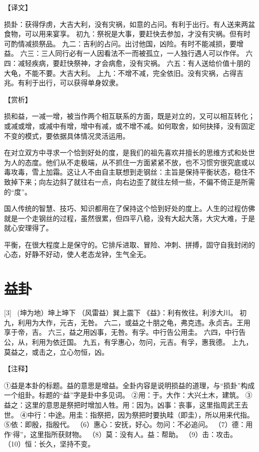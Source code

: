 \documentclass[12pt,UTF8]{ctexbook}
\begin{document}
【译文】

损卦：获得俘虏，大吉大利，没有灾祸，如意的占问。有利于出行。有人送来两盆食物，可以用来宴享。
初九：祭祝是大事，要赶快去参加，才没有灾祸。但有时可酌情减损祭品。
九二：吉利的占问。出讨他国，凶险。有时不能减损，要增益。
六三：三人同行必有一人因看法不一而被孤立，一人独行遇人可以作伴。
六四：减轻疾病，要赶快祭神，才会病愈，没有灾祸。
六五：有人送给价值十朋的大龟，不能不要。大吉大利。
上九：不增不减，完全依旧。没有灾祸，占得吉兆。有利于出行，可以获得单身奴隶。

【赏析】

损和益，一减一增，被当作两个相互联系的方面，既是对立的，又可以相互转化；或减或增，或减中有增，增中有减，或不增不减。如何取舍，如何抉择，没有固定不变的模式，要依据具体情况灵活运用。

在对立双方中寻求一个恰到好处的度，是我们的祖先喜欢并擅长的思维方式和处世为人的态度。他们从不走极端，从不抓住一方面紧紧不放，也不习惯穷很究底或以毒攻毒，雪上加霜。这让人不由自主联想到走钢丝：主旨是保持平衡状态，稳住不致掉下来；向左边斜了就往右一点，向右边歪了就往左倾一些，不偏不倚正是所需的“度”。

国人传统的智慧、技巧、知识都用在了保持这个恰到好处的度上。人生的过程仿佛就是一个走钢丝的过程，虽然很累，但四平八稳，没有大起大落，大灾大难，于是就心安理得了。

平衡，在很大程度上是保守的。它排斥进取、冒险、冲刺、拼搏，固守自我封闭的心态，好静不好动，使人老态龙钟，生气全无。

\chapter{益卦}
[3] \ (坤为地）坤上坤下
（风雷益）巽上震下
《益》：利有攸往。利涉大川。
初九，利用为大作，元吉，无咎。
六二，或益之十朋之龟，弗克违。永贞吉。王用享于帝，吉。
六三，益之用凶事，无咎。有孚。中行告公用圭。
六四，中行告公，从，利用为依迁国。
九五，有孚惠心，勿问，元吉。有孚，惠我德。
上九，莫益之，或击之，立心勿恒，凶。

【注释】

①益是本卦的标题。益的意思是增益。全卦内容是说明损益的道理，与“损卦”构成一个组卦。标题的“益”字是卦中多见词。
②用：于。大作：大兴土木，建筑。
③益之：这里的意思是祭把时增加人牲。用：因为。凶事：丧事，这里指周武王去世。
④中行：中途。用圭：指祭把，因为祭把时要执畦（即圭），所以用来代指。
⑤依：即殷，指殷代。
（6）惠心：安抚，好心。勿问：不必追问。
（7）德：用作‘得”，这里指所获财物。
（8）莫：没有人。益：帮助。
（9）击：攻击。
（10）恒：长久，坚持不变。
\end{document}
